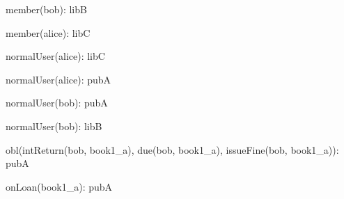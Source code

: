 \documentclass{article}
\begin{document}
{\begin{minipage}{\tableWidth}
\begin{description}[align=left,leftmargin=1em,noitemsep,labelsep=\parindent]
\item{{member(\allowbreak{}bob): libB}}
\item{{member(\allowbreak{}alice): libC}}
\item{{normalUser(\allowbreak{}alice): libC}}
\item{{normalUser(\allowbreak{}alice): pubA}}
\item{{normalUser(\allowbreak{}bob): pubA}}
\item{{normalUser(\allowbreak{}bob): libB}}
\item{{obl(\allowbreak{}intReturn(\allowbreak{}bob, book1\_a), due(\allowbreak{}bob, book1\_a), issueFine(\allowbreak{}bob, book1\_a)): pubA}}
\item{{onLoan(\allowbreak{}book1\_a): pubA}}
\end{description}\end{minipage}}
\end{document}
